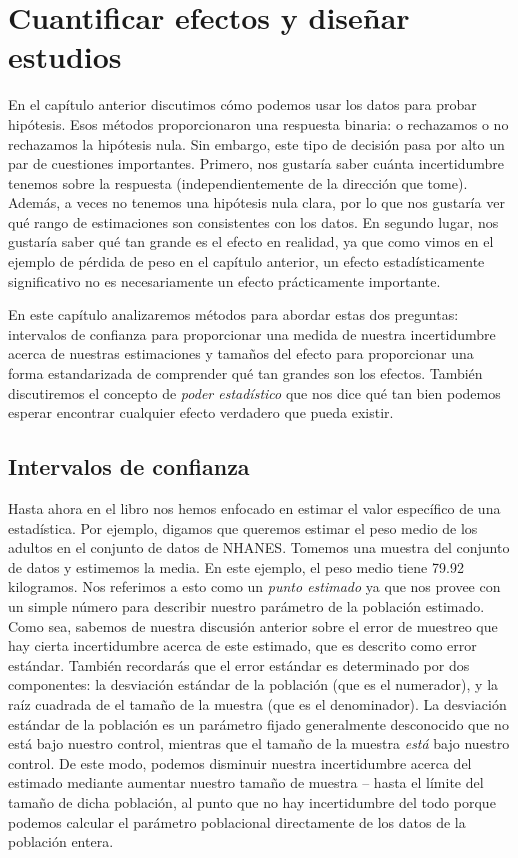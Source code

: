\documentclass[
  12pt,
]{book}
\begin{document}
\hypertarget{ci-effect-size-power}{%
\chapter{Cuantificar efectos y diseñar estudios}\label{ci-effect-size-power}}

En el capítulo anterior discutimos cómo podemos usar los datos para probar hipótesis. Esos métodos proporcionaron una respuesta binaria: o rechazamos o no rechazamos la hipótesis nula. Sin embargo, este tipo de decisión pasa por alto un par de cuestiones importantes. Primero, nos gustaría saber cuánta incertidumbre tenemos sobre la respuesta (independientemente de la dirección que tome). Además, a veces no tenemos una hipótesis nula clara, por lo que nos gustaría ver qué rango de estimaciones son consistentes con los datos. En segundo lugar, nos gustaría saber qué tan grande es el efecto en realidad, ya que como vimos en el ejemplo de pérdida de peso en el capítulo anterior, un efecto estadísticamente significativo no es necesariamente un efecto prácticamente importante.

En este capítulo analizaremos métodos para abordar estas dos preguntas: intervalos de confianza para proporcionar una medida de nuestra incertidumbre acerca de nuestras estimaciones y tamaños del efecto para proporcionar una forma estandarizada de comprender qué tan grandes son los efectos. También discutiremos el concepto de \emph{poder estadístico} que nos dice qué tan bien podemos esperar encontrar cualquier efecto verdadero que pueda existir.

\hypertarget{intervalos-de-confianza}{%
\section{Intervalos de confianza}\label{intervalos-de-confianza}}

Hasta ahora en el libro nos hemos enfocado en estimar el valor específico de una estadística. Por ejemplo, digamos que queremos estimar el peso medio de los adultos en el conjunto de datos de NHANES. Tomemos una muestra del conjunto de datos y estimemos la media. En este ejemplo, el peso medio tiene 79.92 kilogramos. Nos referimos a esto como un \emph{punto estimado} ya que nos provee con un simple número para describir nuestro parámetro de la población estimado. Como sea, sabemos de nuestra discusión anterior sobre el error de muestreo que hay cierta incertidumbre acerca de este estimado, que es descrito como error estándar. También recordarás que el error estándar es determinado por dos componentes: la desviación estándar de la población (que es el numerador), y la raíz cuadrada de el tamaño de la muestra (que es el denominador). La desviación estándar de la población es un parámetro fijado generalmente desconocido que no está bajo nuestro control, mientras que el tamaño de la muestra \emph{está} bajo nuestro control. De este modo, podemos disminuir nuestra incertidumbre acerca del estimado mediante aumentar nuestro tamaño de muestra -- hasta el límite del tamaño de dicha población, al punto que no hay incertidumbre del todo porque podemos calcular el parámetro poblacional directamente de los datos de la población entera.
\end{document}
